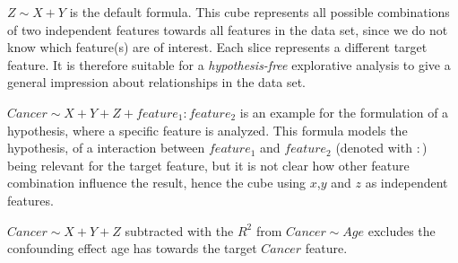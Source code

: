 \documentclass[journal]{style/vgtc} 			          %
\begin{document}
$Z \sim X + Y$ is the default formula.
This cube represents all possible combinations of two independent features towards all features in the data set, since we do not know which feature(s) are of interest.
Each slice represents a different target feature.
It is therefore suitable for a \emph{hypothesis-free} explorative analysis to give a general impression about relationships in the data set.

$Cancer \sim X + Y + Z + feature_1:feature_2$ is an example for the formulation of a hypothesis, where a specific feature is analyzed.
This formula models the hypothesis, of a interaction between $feature_1$ and $feature_2$ (denoted with $:$) being relevant for the target feature, but it is not clear how other feature combination influence the result, hence the cube using $x$,$y$ and $z$ as independent features.

$Cancer \sim X + Y + Z$ subtracted with the $R^2$ from $Cancer \sim Age$ excludes the confounding effect age has towards the target $Cancer$ feature.
\end{document}
